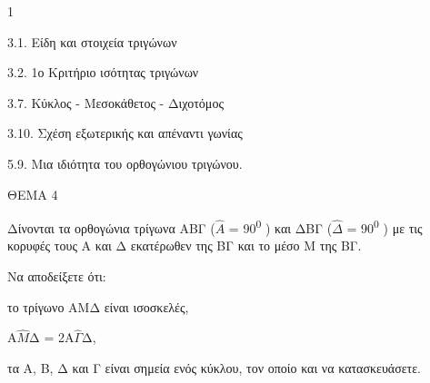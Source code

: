 \begin{ylh}{1}
    \item 3.1. Είδη και στοιχεία τριγώνων
    \item 3.2. 1ο Κριτήριο ισότητας τριγώνων
    \item 3.7. Κύκλος - Μεσοκάθετος - Διχοτόμος
    \item 3.10. Σχέση εξωτερικής και απέναντι γωνίας
    \item 5.9. Μια ιδιότητα του ορθογώνιου τριγώνου.
\end{ylh}

ΘΕΜΑ 4

Δίνονται τα ορθογώνια τρίγωνα ΑΒΓ ($\widehat{Α}$ = 90\textsuperscript{0} ) και ΔΒΓ ($\widehat{\Delta}$ = 90\textsuperscript{0} ) με τις κορυφές τους Α και Δ εκατέρωθεν της ΒΓ και το μέσο Μ της ΒΓ.

Να αποδείξετε ότι:

\begin{alist}
\item το τρίγωνο ΑΜΔ είναι ισοσκελές, 

\item Α$\widehat{Μ}$Δ = 2Α$\widehat{\Gamma}$Δ, 

\item τα Α, Β, Δ και Γ είναι σημεία ενός κύκλου, τον οποίο και να κατασκευάσετε.



\begin{center}
\end{center}
\end{alist}
